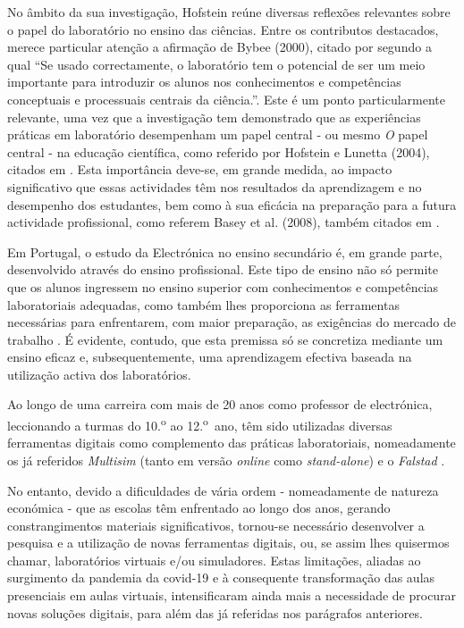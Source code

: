 No âmbito da sua investigação, Hofstein reúne diversas reflexões relevantes sobre o papel do laboratório no ensino das ciências.    
Entre os contributos destacados, merece particular atenção a afirmação de Bybee  (2000), citado por \cite{Hofstein} segundo a qual ``Se usado correctamente, o laboratório tem o potencial de ser um meio importante para introduzir os alunos nos conhecimentos e competências conceptuais e processuais centrais da ciência.''. Este é um ponto particularmente relevante, uma vez que a investigação tem demonstrado que as experiências práticas em laboratório desempenham um papel central - ou mesmo \textit{O} papel central - na educação científica, como referido por Hofstein e Lunetta (2004), citados em \cite{BRINSON2015218}. Esta importância deve-se, em grande medida, ao impacto significativo que essas actividades têm nos resultados da aprendizagem e no desempenho dos estudantes, bem como à sua eficácia na preparação para a futura actividade profissional, como referem Basey et al. (2008), também citados em \cite{BRINSON2015218}.

Em Portugal, o estudo da Electrónica no ensino secundário é, em grande parte, desenvolvido através do ensino profissional. Este tipo de ensino não só permite que os alunos ingressem no ensino superior com conhecimentos e competências laboratoriais adequadas, como também lhes proporciona as ferramentas necessárias para enfrentarem, com maior preparação, as exigências do mercado de trabalho \cite{anqep}. É evidente, contudo, que esta premissa só se concretiza mediante um ensino eficaz e, subsequentemente, uma aprendizagem efectiva baseada na utilização activa dos laboratórios.

Ao longo de uma carreira com mais de 20 anos como professor de electrónica, leccionando a turmas do 10.\textsuperscript{o} ao 12.\textsuperscript{o}~ano, têm sido utilizadas diversas ferramentas digitais como complemento das práticas laboratoriais, nomeadamente os já referidos \textit{Multisim} \cite{multisim} (tanto em versão \textit{online} como \textit{stand-alone}) e o \textit{Falstad} \cite{falstad}.

No entanto, devido a dificuldades de vária ordem - nomeadamente de natureza económica - que as escolas têm enfrentado ao longo dos anos, gerando constrangimentos materiais significativos, tornou-se necessário desenvolver a pesquisa e a utilização de novas ferramentas digitais, ou, se assim lhes quisermos chamar, laboratórios virtuais e/ou simuladores. Estas limitações, aliadas ao surgimento da pandemia da \acrshort{covid-19} e à consequente transformação das aulas presenciais em aulas virtuais, intensificaram ainda mais a necessidade de procurar novas soluções digitais, para além das já referidas nos parágrafos anteriores.

